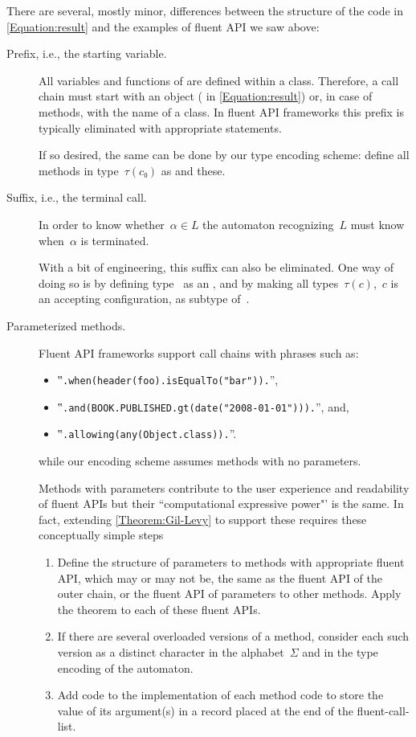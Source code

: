 \documentclass[a4paper,USenglish]{lipics-v2016}
\begin{document}
There are several, mostly minor, differences between the structure of the \Java code
in \cref{Equation:result}
and the examples of fluent API we saw above:
\begin{description}
  \item[Prefix, i.e., the starting  variable.]
  All variables and functions of \Java are defined within a class.
  Therefore, a call chain must start with an object ( in \cref{Equation:result})
  or, in case of  methods, with the name of a class.
  In fluent API frameworks this prefix is typically eliminated
  with appropriate  statements.
  \par
  If so desired, the same can be done by our type encoding scheme: define all
  methods in type~$τ(c₀)$ as  and  these.
  \item[Suffix, i.e., the terminal  call.]
  In order to know whether~$α∈L$ the automaton recognizing~$L$ must
  know when~$α$ is terminated.
  \par
  With a bit of engineering, this suffix can also be eliminated.
  One way of doing so is by defining type~ as an , and by making all types~$τ(c)$,~$c$ is
  an accepting configuration, as subtype of~.
  \item[Parameterized methods.]
  Fluent API frameworks support call chains with phrases such as:
  \begin{itemize}
    \item ‟\lstinline{.when(header(foo).isEqualTo("bar")).}”,
    \item ‟\lstinline{.and(BOOK.PUBLISHED.gt(date("2008-01-01"))).}”, and,
    \item ‟\lstinline{.allowing(any(Object.class)).}”.
  \end{itemize}
  while our encoding scheme assumes methods with no parameters.  
  \par
    Methods with parameters contribute to the user
      experience and readability of fluent APIs but their ``computational expressive power"' is the same.
      In fact, extending
      \cref{Theorem:Gil-Levy} to support these requires these conceptually simple steps 
      \begin{enumerate}
        \item Define the structure of parameters to methods with appropriate fluent API, which may or
          may not be, the same as the fluent API of the outer chain, or the fluent API of parameters to
          other methods. Apply the theorem to each of these fluent APIs.
        \item
          If there are several overloaded versions of a method, consider each such version as a distinct
          character in the alphabet~$Σ$ and in the type encoding of the automaton.
        \item
          Add code to the implementation of each method code to store the 
          value of its argument(s) in a record placed at the end of the fluent-call-list. 
      \end{enumerate}
\end{description}
 
\end{document}
